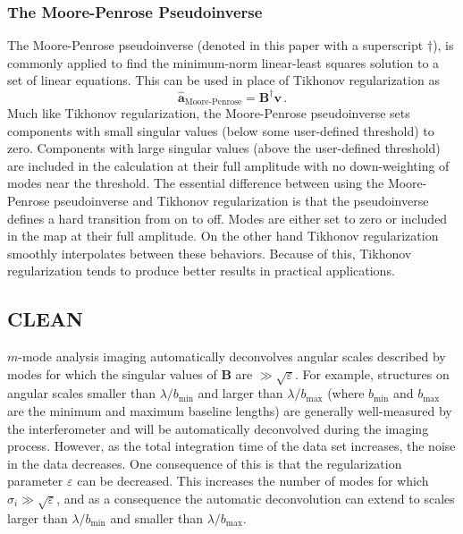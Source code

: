 \documentclass[twocolumn]{aastex61}
\renewcommand{\b}{\pmb}
\begin{document}
\subsubsection{The Moore-Penrose Pseudoinverse}

The Moore-Penrose pseudoinverse (denoted in this paper with a superscript $\dagger$), is commonly
applied to find the minimum-norm linear-least squares solution to a set of linear equations. This
can be used in place of Tikhonov regularization as
\begin{equation}
    \b{\hat a}_\text{Moore-Penrose} = \b B^\dagger\b v\,.
\end{equation}
Much like Tikhonov regularization, the Moore-Penrose pseudoinverse sets components with small
singular values (below some user-defined threshold) to zero. Components with large singular values
(above the user-defined threshold) are included in the calculation at their full amplitude with no
down-weighting of modes near the threshold. The essential difference between using the Moore-Penrose
pseudoinverse and Tikhonov regularization is that the pseudoinverse defines a hard transition from
on to off. Modes are either set to zero or included in the map at their full amplitude. On the other
hand Tikhonov regularization smoothly interpolates between these behaviors. Because of this,
Tikhonov regularization tends to produce better results in practical applications.

\subsection{CLEAN}

$m$-mode analysis imaging automatically deconvolves angular scales described by modes for which the
singular values of $\b B$ are $\gg \sqrt{\varepsilon}$. For example, structures on angular scales
smaller than $\lambda/b_\text{min}$ and larger than $\lambda/b_\text{max}$ (where $b_\text{min}$ and
$b_\text{max}$ are the minimum and maximum baseline lengths) are generally well-measured by the
interferometer and will be automatically deconvolved during the imaging process. However, as the
total integration time of the data set increases, the noise in the data decreases. One consequence
of this is that the regularization parameter $\varepsilon$ can be decreased. This increases the
number of modes for which $\sigma_i \gg \sqrt{\varepsilon}$, and as a consequence the automatic
deconvolution can extend to scales larger than $\lambda/b_\text{min}$ and smaller than
$\lambda/b_\text{max}$.
\end{document}
